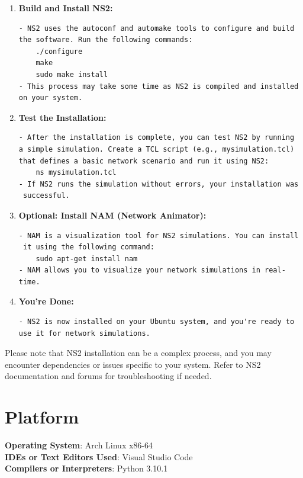 \documentclass[11pt]{article}
\begin{document}
\begin{enumerate}
    \item \textbf{Build and Install NS2:}
          \begin{verbatim}
- NS2 uses the autoconf and automake tools to configure and build 
the software. Run the following commands:
    ./configure
    make
    sudo make install
- This process may take some time as NS2 is compiled and installed 
on your system.
       \end{verbatim}

    \item \textbf{Test the Installation:}
          \begin{verbatim}
- After the installation is complete, you can test NS2 by running 
a simple simulation. Create a TCL script (e.g., mysimulation.tcl) 
that defines a basic network scenario and run it using NS2:
    ns mysimulation.tcl
- If NS2 runs the simulation without errors, your installation was
 successful.
       \end{verbatim}

    \item \textbf{Optional: Install NAM (Network Animator):}
          \begin{verbatim}
- NAM is a visualization tool for NS2 simulations. You can install
 it using the following command:
    sudo apt-get install nam
- NAM allows you to visualize your network simulations in real-time.
       \end{verbatim}

    \item \textbf{You're Done:}
          \begin{verbatim}
- NS2 is now installed on your Ubuntu system, and you're ready to 
use it for network simulations.
       \end{verbatim}

\end{enumerate}

Please note that NS2 installation can be a complex process, and you may encounter dependencies or issues specific to your system. Refer to NS2 documentation and forums for troubleshooting if needed.


\section{Platform}
\textbf{Operating System}: Arch Linux x86-64 \\
\textbf{IDEs or Text Editors Used}: Visual Studio Code\\
\textbf{Compilers or Interpreters}: Python 3.10.1\\
\end{document}
